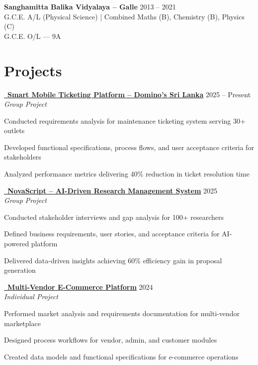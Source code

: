 \documentclass[letterpaper,10.8pt]{article}
\newenvironment{resume_list}{
  \vspace{-1pt}
  \begin{itemize}[itemsep=2pt, leftmargin=14pt]
}{
  \end{itemize}\vspace{-2pt}
}
\begin{document}
\vspace{2pt}
\noindent\textbf{Sanghamitta Balika Vidyalaya – Galle} \hfill 2013 – 2021\\
\noindent G.C.E. A/L (Physical Science) | Combined Maths (B), Chemistry (B), Physics (C)\\
\noindent G.C.E. O/L — 9A

\section{Projects}
\vspace{-2pt}

\newcommand{\project}[5]{%
  \noindent
  \href{#1}{\faGithub~\textbf{#2}} \hfill #3\\[-1pt]
  \textit{#4}\\[-5pt]
  \begin{resume_list}
    #5
  \end{resume_list}
  \vspace{4pt}
}

\project{https://github.com/fixpoint-tech}
{Smart Mobile Ticketing Platform – Domino's Sri Lanka}
{2025 – Present}
{Group Project}{
  \item Conducted requirements analysis for maintenance ticketing system serving 30+ outlets
  \item Developed functional specifications, process flows, and user acceptance criteria for stakeholders
  \item Analyzed performance metrics delivering 40\% reduction in ticket resolution time
}

\vspace{8pt}

\project{https://github.com/Chandima0406/NovaScript.git}
{NovaScript – AI-Driven Research Management System}
{2025}
{Group Project}{
  \item Conducted stakeholder interviews and gap analysis for 100+ researchers
  \item Defined business requirements, user stories, and acceptance criteria for AI-powered platform
  \item Delivered data-driven insights achieving 60\% efficiency gain in proposal generation
}

\vspace{8pt}

\project{https://github.com/vindyakodithuwakku02/gocart.git}
{Multi-Vendor E-Commerce Platform}
{2024}
{Individual Project}{
  \item Performed market analysis and requirements documentation for multi-vendor marketplace
  \item Designed process workflows for vendor, admin, and customer modules
  \item Created data models and functional specifications for e-commerce operations
}
\end{document}
